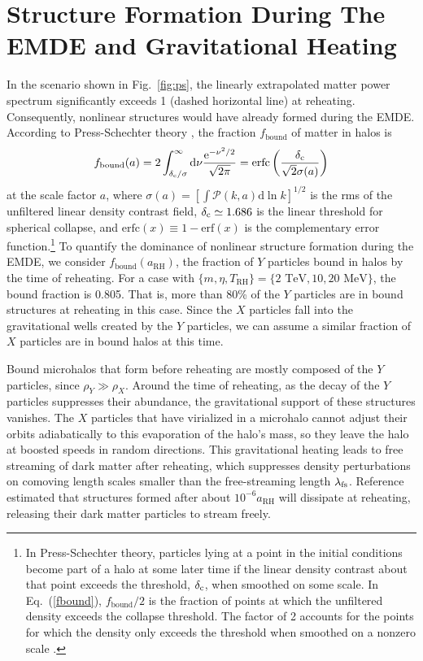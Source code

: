 \documentclass[a4paper,11pt]{article}
\newcommand{\rh}[1]{{#1}_{\mathrm{RH}}}
\newcommand{\lfs}{\lambda_{\rm fs}}
\newcommand{\dc}{\delta_{\rm c}}
\newcommand{\diff}{\ensuremath{\mathrm{d}}}
\newcommand{\e}{\mathrm{e}}
\begin{document}
\section{Structure Formation During The EMDE and Gravitational Heating}
\label{heating}

In the scenario shown in Fig.~\ref{fig:ps}, the linearly extrapolated matter power spectrum significantly exceeds 1 (dashed horizontal line) at reheating. Consequently, nonlinear structures would have already formed during the EMDE.
According to Press-Schechter theory \cite{press-schechter}, the fraction $f_\mathrm{bound}$ of matter in halos is
\begin{equation}\label{fbound}
    f_\mathrm{bound}(a) = 2\int_{\dc/\sigma}^\infty \diff\nu \frac{\e^{-\nu^2/2}}{\sqrt{2\pi}}
    =\mathrm{erfc}\left(\frac{\dc}{\sqrt{2}\sigma(a)}\right)
\end{equation}
at the scale factor $a$, where $\sigma(a) = [\int \mathcal{P}(k,a)\diff \ln k]^{1/2}$ is the rms of the unfiltered linear density contrast field, $\dc\simeq 1.686$ is the linear threshold for spherical collapse, and $\mathrm{erfc}(x)\equiv 1-\mathrm{erf}(x)$ is the complementary error function.\footnote{In Press-Schechter theory, particles lying at a point in the initial conditions become part of a halo at some later time if the linear density contrast about that point exceeds the threshold, $\dc$, when smoothed on some scale. In Eq.~(\ref{fbound}), $f_\mathrm{bound}/2$ is the fraction of points at which the unfiltered density exceeds the collapse threshold. The factor of 2 accounts for the points for which the density only exceeds the threshold when smoothed on a nonzero scale \cite{1991ApJ...379..440B}.}
To quantify the dominance of nonlinear structure formation during the EMDE, we consider $f_\mathrm{bound}(\rh{a})$, the fraction of $Y$ particles bound in halos by the time of reheating. For a case with $\{m,\eta,\rh{T}\} = \{2 \text{ TeV},10, {20} \text{ MeV} \}$, the bound fraction is 0.805. That is, more than 80\% of the $Y$ particles are in bound structures at reheating in this case. Since the $X$ particles fall into the gravitational wells created by the $Y$ particles, we can assume a similar fraction of $X$ particles are in bound halos at this time.

Bound microhalos that form before reheating are mostly composed of the $Y$ particles, since $\rho_Y \gg \rho_X$. Around the time of reheating, as the decay of the $Y$ particles suppresses their abundance, the gravitational support of these structures vanishes. The $X$ particles that have virialized in a microhalo cannot adjust their orbits adiabatically to this evaporation of the halo's mass, so they leave the halo at boosted speeds in random directions. This gravitational heating leads to free streaming of dark matter after reheating, which suppresses density perturbations on comoving length scales smaller than the free-streaming length $\lfs$. Reference \cite{blanco19} estimated that structures formed after about $10^{-6} \rh{a}$ will dissipate at reheating, releasing their dark matter particles to stream freely. 
\end{document}
